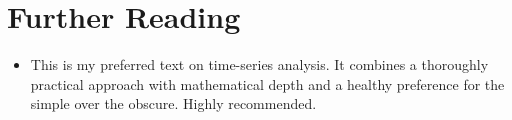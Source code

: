 \section{Further Reading}

\begin{itemize}
\item {}
    This is my preferred text on time-series analysis. It combines a
    thoroughly practical approach with mathematical depth and a healthy
    preference for the simple over the obscure. Highly recommended.
\end{itemize}

